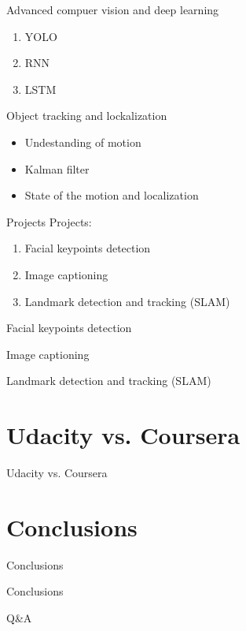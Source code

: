\documentclass{beamer}
\begin{document}
\begin{frame}{Advanced compuer vision and deep learning}
\begin{enumerate}
\item YOLO
\item RNN
\item LSTM
\end{enumerate}
\end{frame}

\begin{frame}{Object tracking and lockalization}
\begin{itemize}
\item Undestanding of motion
\item Kalman filter
\item State of the motion and localization
\end{itemize}
\end{frame}


\begin{frame}{Projects}
Projects:
\begin{enumerate}
\item Facial keypoints detection
\item Image captioning
\item Landmark detection and tracking (SLAM)
\end{enumerate}
\end{frame}

\begin{frame}{Facial keypoints detection}
\end{frame}

\begin{frame}{Image captioning}
\end{frame}

\begin{frame}{Landmark detection and tracking (SLAM)}
\end{frame}


\section{Udacity vs. Coursera}

\begin{frame}{Udacity vs. Coursera}
\end{frame}

\section{Conclusions}
\begin{frame}
\begin{center}
\huge Conclusions
\end{center}
\end{frame}

\begin{frame}{Conclusions}
\end{frame}

\begin{frame}{Q\&A}
\end{frame}
\end{document}
